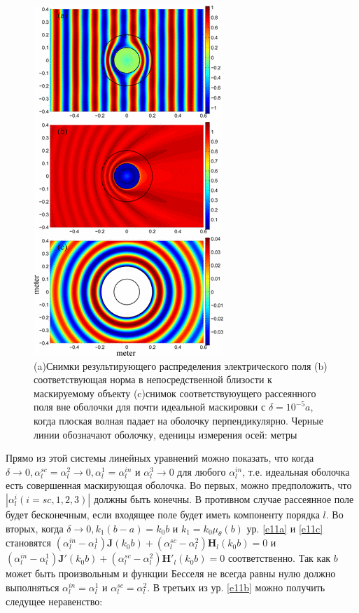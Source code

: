\documentclass[a4paper, 12pt]{article}
\begin{document}
\begin{figure}[t]
  \centering
  \includegraphics[height=0.3\paperheight, width=0.22\paperwidth]{2.png}
  \caption{(a)Снимки результирующего распределения электрического поля (b) соответствующая норма в непосредственной 
  близости к маскируемому объекту (c)снимок соответствуюущего рассеянного поля вне оболочки для почти идеальной маскировки
  с $\delta = 10^{-5}a$, когда плоская волная падает на оболочку перпендикулярно. Черные линии обозначают оболочку, еденицы
  измерения осей: метры}
  \label{fig:2}
\end{figure}

Прямо из этой системы линейных уравнений можно показать, что когда $\delta \to 0, \alpha_l^{sc}=\alpha_l^{2} \to 0, 
\alpha_l^1=\alpha_l^{in}$ и $\alpha_l^3 \to 0$ для любого $\alpha_l^{in}$, т.е. идеальная оболочка есть совершенная 
маскирующая оболочка. Во первых, можно предположить, что $\left| \alpha_l^i(i=sc,1,2,3) \right|$ должны быть конечны.
В противном случае рассеянное поле будет бесконечным, если входящее поле будет иметь компоненту порядка $l$. Во вторых,
когда $\delta \to 0, k_1(b-a)=k_0 b$ и $k_1=k_0 \mu_\theta(b)$ ур. \eqref{e11a} и \eqref{e11c} становятся 
$(\alpha_l^{in}-\alpha_l^1)\mathbf{J}(k_0 b) + (\alpha_l^{sc}-\alpha_l^2)\mathbf{H}_l(k_0 b) = 0$ и 
$(\alpha_l^{in}-\alpha_l^1)\mathbf{J'}(k_0 b) + (\alpha_l^{sc}-\alpha_l^2)\mathbf{H'}_l(k_0 b) = 0$ соответственно.
Так как $b$ может быть произвольным и функции Бесселя не всегда равны нулю должно выполняться $\alpha_l^{in}=\alpha_l^1$ и
$\alpha_l^{sc}=\alpha_l^2$. В третьих из ур. \eqref{e11b} можно получить следущее неравенство:
\end{document}
